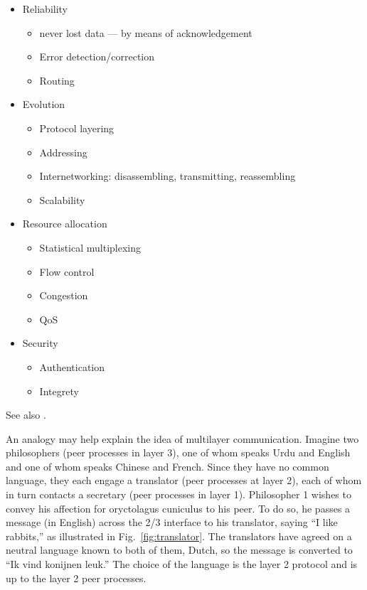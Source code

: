 \begin{multicols}{2}
  \begin{itemize}
  \item Reliability
    \begin{itemize}
    \item never lost data --- by means of acknowledgement
    \item Error detection/correction
    \item Routing
    \end{itemize}
  \item Evolution
    \begin{itemize}
    \item Protocol layering
    \item Addressing
    \item Internetworking: disassembling, transmitting, reassembling
    \item Scalability
    \end{itemize}
  \item Resource allocation
    \begin{itemize}
    \item Statistical multiplexing
    \item Flow control
    \item Congestion
    \item QoS
    \end{itemize}
  \item Security
    \begin{itemize}
    \item Authentication
    \item Integrety
    \end{itemize}
  \end{itemize}
\end{multicols}

See also .

An analogy may help explain the idea of multilayer communication. Imagine two philosophers
(peer processes in layer 3), one of whom speaks Urdu and English and one of whom speaks
Chinese and French. Since they have no common language, they each engage a translator
(peer processes at layer 2), each of whom in turn contacts a secretary (peer processes in
layer 1). Philosopher 1 wishes to convey his affection for oryctolagus cuniculus to his
peer. To do so, he passes a message (in English) across the 2/3 interface to his
translator, saying ``I like rabbits,'' as illustrated in Fig.~\ref{fig:translator}. The
translators have agreed on a neutral language known to both of them, Dutch, so the message
is converted to ``Ik vind konijnen leuk.'' The choice of the language is the layer 2
protocol and is up to the layer 2 peer processes.

